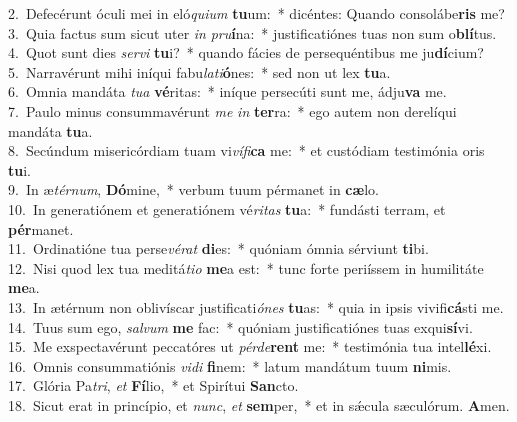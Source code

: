 {2.~}Defecérunt óculi mei in eló\textit{qui}\textit{um} \textbf{tu}um:~* dicéntes: Quando consolábe\textbf{ris} me?\\
{3.~}Quia factus sum sicut uter \textit{in} \textit{pru}\textbf{í}na:~* justificatiónes tuas non sum o\textbf{blí}tus.\\
{4.~}Quot sunt dies \textit{ser}\textit{vi} \textbf{tu}i?~* quando fácies de persequéntibus me ju\textbf{dí}cium?\\
{5.~}Narravérunt mihi iníqui fabu\textit{la}\textit{ti}\textbf{ó}nes:~* sed non ut lex \textbf{tu}a.\\
{6.~}Omnia mandáta \textit{tu}\textit{a} \textbf{vé}ritas:~* iníque persecúti sunt me, ádju\textbf{va} me.\\
{7.~}Paulo minus consummavérunt \textit{me} \textit{in} \textbf{ter}ra:~* ego autem non derelíqui mandáta \textbf{tu}a.\\
{8.~}Secúndum misericórdiam tuam vi\textit{ví}\textit{fi}\textbf{ca} me:~* et custódiam testimónia oris \textbf{tu}i.\\
{9.~}In æ\textit{tér}\textit{num}, \textbf{Dó}mine,~* verbum tuum pérmanet in \textbf{cæ}lo.\\
{10.~}In generatiónem et generatiónem vé\textit{ri}\textit{tas} \textbf{tu}a:~* fundásti terram, et \textbf{pér}manet.\\
{11.~}Ordinatióne tua perse\textit{vé}\textit{rat} \textbf{di}es:~* quóniam ómnia sérviunt \textbf{ti}bi.\\
{12.~}Nisi quod lex tua meditá\textit{ti}\textit{o} \textbf{me}a est:~* tunc forte periíssem in humilitáte \textbf{me}a.\\
{13.~}In ætérnum non oblivíscar justificati\textit{ó}\textit{nes} \textbf{tu}as:~* quia in ipsis vivifi\textbf{cá}sti me.\\
{14.~}Tuus sum ego, \textit{sal}\textit{vum} \textbf{me} fac:~* quóniam justificatiónes tuas exqui\textbf{sí}vi.\\
{15.~}Me exspectavérunt peccatóres ut \textit{pér}\textit{de}\textbf{rent} me:~* testimónia tua intel\textbf{lé}xi.\\
{16.~}Omnis consummatiónis \textit{vi}\textit{di} \textbf{fi}nem:~* latum mandátum tuum \textbf{ni}mis.\\
{17.~}Glória Pa\textit{tri}, \textit{et} \textbf{Fí}lio,~* et Spirítui \textbf{San}cto.\\
{18.~}Sicut erat in princípio, et \textit{nunc}, \textit{et} \textbf{sem}per,~* et in sǽcula sæculórum. \textbf{A}men.\\
